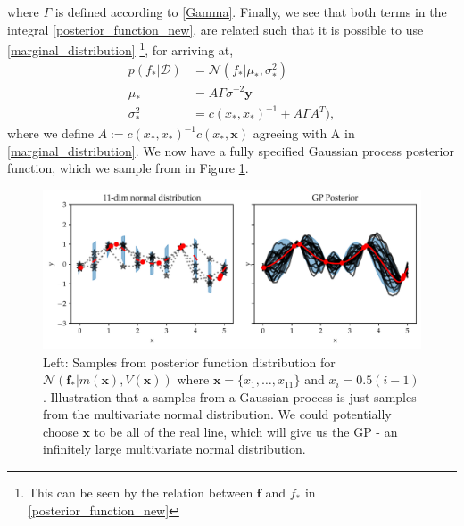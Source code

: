 where $\Gamma$ is defined according to \eqref{Gamma}. Finally, we see that both terms in the
integral \eqref{posterior_function_new}, are related such that it is possible to use
\eqref{marginal_distribution} \footnote{This can be seen by the relation between $\textbf{f}$ and
$f_*$ in \eqref{posterior_function_new}}, for arriving at, 
\begin{align*}
    p(f_*|\mathcal{D}) &= \mathcal{N}(f_*|\mu_*,\sigma_*^2 )\\
    \mu_* &=  A\Gamma\sigma^{-2}\textbf{y}\\
    \sigma_*^2 &=  c(x_*, x_*)^{-1}+A\Gamma A^T),
\end{align*}
where we define $A :=  c(x_*,x_*)^{-1} c(x_*, \textbf{x})$ agreeing with A in \eqref{marginal_distribution}.
We now have a fully specified Gaussian process posterior function, which we sample from 
in Figure \ref{GP_illustration2}. 


\begin{figure}[h]
    \centering
    \includegraphics[width = \textwidth]{Pictures/GP2_samples_mattern.pdf}
    \caption{Left: Samples from posterior function distribution for
    $\mathcal{N}(\textbf{f}_*|m(\textbf{x}),V(\textbf{x}))$ where $\textbf{x} = \{x_1,\dots, x_{11}\}$
    and $x_i= 0.5(i-1)$. Illustration that a samples from a Gaussian process is just samples from
    the multivariate normal distribution. We could potentially choose $\textbf{x}$ to be all of the
    real line, which will give us the GP - an infinitely large multivariate normal distribution.}
    \label{GP_illustration2}
\end{figure}



